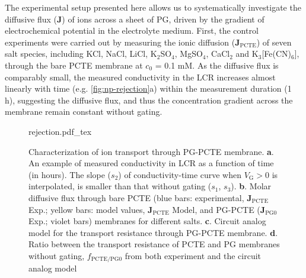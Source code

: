 The experimental setup presented here allows us to systematically
investigate the diffusive flux ($\symbf{J}$) of ions across a sheet of
PG, driven by the gradient of electrochemical potential in the
electrolyte medium.
%
First, the control experiments were carried out by measuring the ionic
diffusion ($\symbf{J}_{\mathrm{PCTE}}$) of seven salt species,
including KCl, NaCl, LiCl, K$_{2}$SO$_{4}$, MgSO$_{4}$, CaCl$_{2}$ and
K$_{3}$[Fe(CN)$_{6}$], through the bare PCTE membrane at $c_{0}$ = 0.1
mM.
%
As the diffusive flux is comparably small, the measured conductivity
in the LCR increases almost linearly with time (e.g.
\autoref{fig:np-rejection}a) within the measurement duration (1 h), suggesting
the diffusive flux, and thus the concentration gradient across the
membrane remain constant without gating.
%
\begin{figure}[!htbp]
  \centering{}
  {rejection.pdf_tex}
  \caption{Characterization of ion transport through PG-PCTE membrane.
    \textbf{a}. An example of measured conductivity in LCR as a
    function of time (in hours). The slope ($s_{2}$) of
    conductivity-time curve when $V_{\mathrm{G}}>0$ is interpolated,
    is smaller than that without gating ($s_{1}$,
    $s_{3}$). \textbf{b}. Molar diffusive flux through bare PCTE (blue
    bars: experimental, $\symbf{J}_{\mathrm{PCTE}}$ Exp.; yellow bars:
    model values, $\symbf{J}_{\mathrm{PCTE}}$ Model, and PG-PCTE
    ($\symbf{J}_{\mathrm{PG0}}$ Exp.; violet bars) membranes for
    different salts. \textbf{c}. Circuit analog model for the
    transport resistance through PG-PCTE membrane. \textbf{d}. Ratio
    between the transport resistance of PCTE and PG membranes without
    gating, $f_{\mathrm{PCTE/PG0}}$ from both experiment and the
    circuit analog model}
  \label{fig:np-rejection}
\end{figure}

